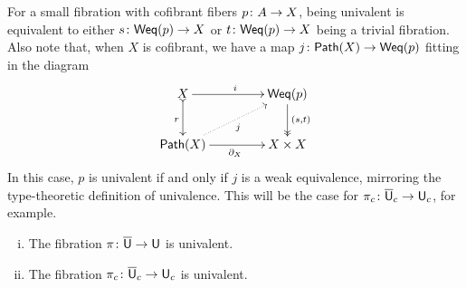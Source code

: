 \documentclass[reqno,10pt,a4paper,oneside,draft]{amsart}
\begin{document}
\smallskip

For a small fibration with cofibrant fibers $p \colon A \to X$, being univalent is equivalent to
either $s \colon \mathsf{Weq}(p) \to X$ or $t \colon \mathsf{Weq}(p) \to X$ being a trivial fibration.  Also note that, when $X$
is cofibrant, we have a map $j \colon \mathsf{Path}(X) \to \mathsf{Weq}(p)$ fitting in the diagram
\[
\xymatrix@C=1.5cm{
X \ar[r]^i \ar@{>->}[d]_r & \Weq(p) \ar@{->>}[d]^{(s,t)} \\
\Path(X) \ar[r]_{\partial_X}  \ar@{.>}[ur]_{j} &  X \times X }
\]
In this case, $p$ is univalent if and only if $j$ is a weak equivalence, mirroring the type-theoretic
definition of univalence. This will be the case for $\pi_c \colon \overline{\mathsf{U}}_c \to \mathsf{U}_c$, for example.





\begin{theorem}  \label{thm:univalence-of-u-and-uc} \hfill 
\begin{enumerate}[(i)]
\item The fibration $\pi \colon \overline{\mathsf{U}} \to \mathsf{U}$ is univalent.
\item The fibration $\pi_c \colon \overline{\mathsf{U}}_c \to \mathsf{U}_c$ is univalent.
\end{enumerate}
\end{theorem}
\end{document}
